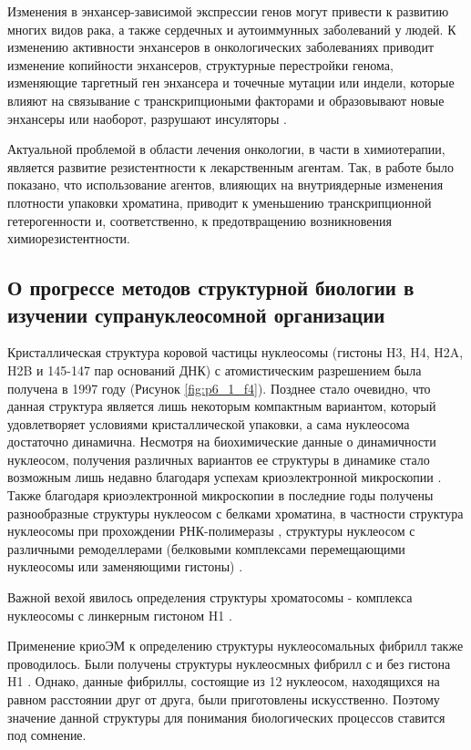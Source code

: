     Изменения в энхансер-зависимой экспрессии генов могут привести к развитию многих видов рака, а также сердечных и аутоиммунных заболеваний у людей. К изменению активности энхансеров в онкологических заболеваниях  приводит изменение копийности энхансеров, структурные перестройки генома, изменяющие таргетный ген энхансера и точечные мутации или индели, которые влияют на связывание с транскрипциоными факторами и образовывают новые энхансеры или наоборот, разрушают инсуляторы \cite{sur_role_2016}. 
    
    Актуальной проблемой в области лечения онкологии, в части в химиотерапии, является развитие резистентности к лекарственным агентам. Так, в работе \cite{almassalha_macrogenomic_2017} было показано, что использование агентов, влияющих на внутриядерные изменения плотности упаковки хроматина, приводит к уменьшению транскрипционной гетерогенности и, соответственно, к предотвращению возникновения химиорезистентности. 
    
 \subsection{О прогрессе методов структурной биологии в изучении супрануклеосомной организации} 

    Кристаллическая структура коровой частицы нуклеосомы (гистоны H3, H4, H2A, H2B и 145-147 пар оснований ДНК) с атомистическим разрешением была получена в 1997 году \cite{luger_crystal_1997} (Рисунок \ref{fig:p6_1_f4}). Позднее стало очевидно, что данная структура является лишь некоторым компактным вариантом, который удовлетворяет условиями кристаллической упаковки, а сама нуклеосома достаточно динамична. Несмотря на биохимические данные о динамичности нуклеосом, получения различных вариантов ее структуры в динамике стало возможным лишь недавно благодаря успехам криоэлектронной микроскопии \cite{bilokapic_structural_2018}. Также благодаря криоэлектронной микроскопии в последние годы получены разнообразные структуры нуклеосом с белками хроматина, в частности структура нуклеосомы при прохождении РНК-полимеразы \cite{ehara_structural_2019}, структуры нуклеосом с различными ремоделлерами (белковыми комплексами перемещающими нуклеосомы или заменяющими гистоны) \cite{farnung_nucleosomechd1_2017,li_mechanism_2019,yan_structures_2019}.
    
    Важной вехой явилось определения структуры хроматосомы - комплекса нуклеосомы с линкерным гистоном H1 \cite{bednar_structure_2017}.
    
    Применение криоЭМ к определению структуры нуклеосомальных фибрилл также проводилось. Были получены структуры нуклеосмных фибрилл с и без гистона H1 \cite{song_cryo-em_2014}. Однако, данные фибриллы, состоящие из 12 нуклеосом, находящихся на равном расстоянии друг от друга, были приготовлены искусственно. Поэтому значение данной структуры для понимания биологических процессов ставится под сомнение.

